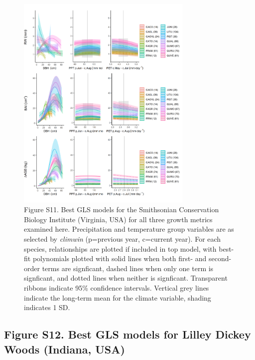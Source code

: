 \documentclass[
]{article}
\begin{document}
\begin{figure}
\centering
\includegraphics[width=0.75\textwidth,height=\textheight]{tables_figures/SI_figures/composite_plots/SCBI.png}
\caption{Figure S11. Best GLS models for the Smithsonian Conservation
Biology Institute (Virginia, USA) for all three growth metrics examined
here. Precipitation and temperature group variables are as selected by
\emph{climwin} (p=previous year, c=current year). For each species,
relationships are plotted if included in top model, with best-fit
polynomials plotted with solid lines when both first- and second-order
terms are signficant, dashed lines when only one term is signficant, and
dotted lines when neither is signficant. Transparent ribbons indicate
95\% confidence intervals. Vertical grey lines indicate the long-term
mean for the climate variable, shading indicates 1 SD.}
\end{figure}

\newpage

\hypertarget{figure-s12.-best-gls-models-for-lilley-dickey-woods-indiana-usa}{%
\subsection{Figure S12. Best GLS models for Lilley Dickey Woods
(Indiana,
USA)}\label{figure-s12.-best-gls-models-for-lilley-dickey-woods-indiana-usa}}
\end{document}
